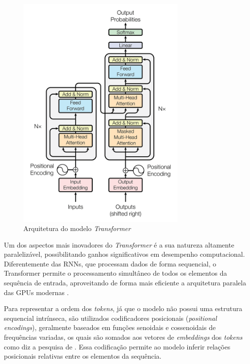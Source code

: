\begin{figure}[H]
    \centering
    \includegraphics[width=0.75\textwidth]{imgs/transformer.png}
    \caption{Arquitetura do modelo \textit{Transformer} \cite{vaswani2017}}
    \label{fig:transformer}
\end{figure}


Um dos aspectos mais inovadores do \textit{Transformer} é a sua natureza altamente paralelizável, possibilitando ganhos significativos em desempenho computacional. Diferentemente das RNNs, que processam dados de forma sequencial, o Transformer permite o processamento simultâneo de todos os elementos da sequência de entrada, aproveitando de forma mais eficiente a arquitetura paralela das GPUs modernas \cite{ankit2024transformer}.

Para representar a ordem dos \textit{tokens}, já que o modelo não possui uma estrutura sequencial intrínseca, são utilizados codificadores posicionais (\textit{positional encodings}), geralmente baseados em funções senoidais e cossenoidais de frequências variadas, os quais são somados aos vetores de \textit{embeddings} dos \textit{tokens} como diz a pesquisa de . Essa codificação permite ao modelo inferir relações posicionais relativas entre os elementos da sequência.


